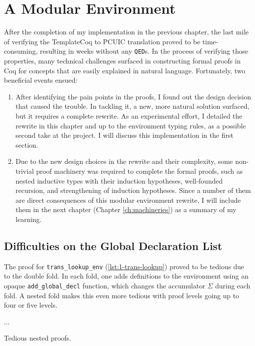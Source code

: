 \chapter{A Modular Environment}
\label{ch:impl2}

After the completion of my implementation in the previous chapter, the last mile
of verifying the TemplateCoq to PCUIC translation proved to be time-consuming,
resulting in weeks without any \verb|QED|s. In the process of verifying those
properties, many technical challenges surfaced in constructing formal proofs in
Coq for concepts that are easily explained in natural language. Fortunately, two
beneficial events ensued:
\begin{enumerate}
  \item After identifying the pain points in the proofs, I found out the design
  decision that caused the trouble. In tackling it, a new, more natural solution
  surfaced, but it requires a complete rewrite. As an experimental effort, I
  detailed the rewrite in this chapter and up to the environment typing rules,
  as a possible second take at the project. I will discuss this implementation
  in the first section.
  \item Due to the new design choices in the rewrite and their complexity, some
  non-trivial proof machinery was required to complete the formal proofs, such
  as nested inductive types with their induction hypotheses, well-founded
  recursion, and strengthening of induction hypotheses. Since a number of them
  are direct consequences of this modular environment rewrite, I will include
  them in the next chapter (Chapter \ref{ch:machineries}) as a summary of my
  learning.
\end{enumerate}


\section{Difficulties on the Global Declaration List}

The proof for \verb|trans_lookup_env| (\ref{lst:1-trans-lookup}) proved to be
tedious due to the double fold. In each fold, one adds definitions to the
environment using an opaque \verb|add_global_decl| function, which changes the
accumulator $\Sigma$ during each fold. A nested fold makes this even more
tedious with proof levels going up to four or five levels.

\begin{listing}[H]
...
  \caption{Tedious nested proofs.}
  \label{lst:2-nested-proofs}
\end{listing}

